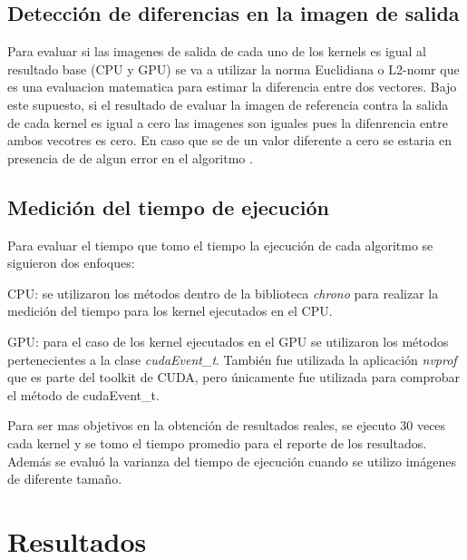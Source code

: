 \documentclass[conference]{IEEEtran}
\begin{document}
\subsection{\textbf{Detección de diferencias en la imagen de salida}}
Para evaluar si las imagenes de salida de cada uno de los kernels es igual al resultado base (CPU y GPU) se va a utilizar la norma Euclidiana o L2-nomr que es una evaluacion matematica para estimar la diferencia entre dos vectores. Bajo este supuesto, si el resultado de evaluar la imagen de referencia contra la salida de cada kernel es igual a cero las imagenes son iguales pues la difenrencia entre ambos vecotres es cero. En caso que se de un valor diferente a cero se estaria en presencia de de algun error en el algoritmo \cite{log0}\cite{norm2}.


\subsection{\textbf{Medición del tiempo de ejecución}}
Para evaluar el tiempo que tomo el tiempo la ejecución de cada algoritmo se siguieron dos enfoques:
\begin{list}{•}{}
\item
CPU: se utilizaron los métodos dentro de la biblioteca \textit{chrono} para realizar la medición del tiempo para los kernel ejecutados en el CPU.
\item
GPU: para el caso de los kernel ejecutados en el GPU se utilizaron los métodos pertenecientes a la clase \textit{cudaEvent\_t}. También fue utilizada la aplicación \textit{nvprof} que es parte del toolkit de CUDA, pero únicamente fue utilizada para comprobar el método de cudaEvent\_t.
\end{list}

Para ser mas objetivos en la obtención de resultados reales, se ejecuto 30 veces cada kernel y se tomo el tiempo promedio para el reporte de los resultados. Además se evaluó la varianza del tiempo de ejecución cuando se utilizo imágenes de diferente tamaño.

\section{\textbf{Resultados}}
\end{document}
